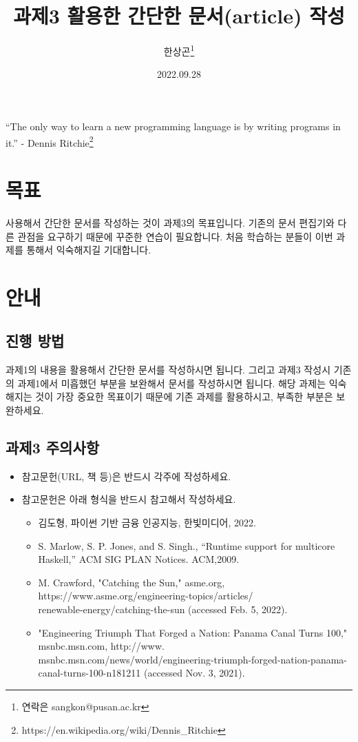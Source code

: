 \documentclass[11pt, a4paper]{article}
\begin{document}
\title{과제3  활용한 간단한 문서(article) 작성}
\author{한상곤\footnote{연락은 sangkon@pusan.ac.kr}}
\date{2022.09.28}
\maketitle

\begin{displayquote}
“The only way to learn a new programming language is by writing programs in it.”  - Dennis Ritchie{\footnote{https://en.wikipedia.org/wiki/Dennis\_Ritchie}}
\end{displayquote}

\section{목표}
 사용해서 간단한 문서를 작성하는 것이 과제3의 목표입니다.  기존의 문서 편집기와 다른 관점을 요구하기 때문에 꾸준한 연습이 필요합니다.  처음 학습하는 분들이 이번 과제를 통해서  익숙해지길 기대합니다.

\section{안내}
\subsection{진행 방법}
과제1의 내용을  활용해서 간단한 문서를 작성하시면 됩니다. 그리고 과제3 작성시 기존의 과제1에서 미흡했던 부분을 보완해서 문서를 작성하시면 됩니다. 해당 과제는  익숙해지는 것이 가장 중요한 목표이기 때문에 기존 과제를 활용하시고, 부족한 부분은 보완하세요.

\subsection{과제3 주의사항}
\begin{itemize}
    \item 참고문헌(URL, 책 등)은 반드시 각주에 작성하세요.
    \item 참고문헌은 아래 형식을 반드시 참고해서 작성하세요.
    \begin{itemize}
        \item 김도형, 파이썬 기반 금융 인공지능, 한빛미디어, 2022.
        \item S. Marlow, S. P. Jones, and S. Singh., “Runtime support for multicore Haskell,” ACM SIG PLAN Notices. ACM,2009.
        \item M. Crawford, "Catching the Sun," asme.org, \\ https://www.asme.org/engineering-topics/articles/ \\ renewable-energy/catching-the-sun (accessed Feb. 5, 2022).
        \item "Engineering Triumph That Forged a Nation: Panama Canal Turns 100,"  msnbc.msn.com, http://www. \\ msnbc.msn.com/news/world/engineering-triumph-forged-nation-panama-canal-turns-100-n181211 (accessed Nov. 3, 2021).
    \end{itemize}
\end{itemize}
\end{document}
